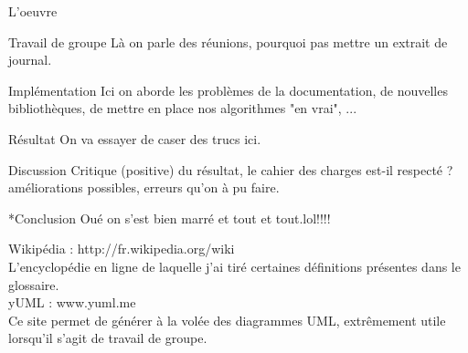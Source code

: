 \documentclass[a4paper, 12pt]{report}
\begin{document}
	\begin{part}{L'oeuvre}
		\begin{chapter}{Travail de groupe}
			Là on parle des réunions, pourquoi pas mettre un extrait de journal.
		\end{chapter}
		\begin{chapter}{Implémentation}
			Ici on aborde les problèmes de la documentation, de nouvelles bibliothèques, de mettre en place nos algorithmes "en vrai", ... 
		\end{chapter}
		\begin{chapter}{Résultat}
			On va essayer de caser des trucs ici.
		\end{chapter}
		\begin{chapter}{Discussion}
			Critique (positive) du résultat, le cahier des charges est-il respecté ? améliorations possibles, erreurs qu'on à pu faire.
		\end{chapter}
	\end{part}
	\begin{chapter}*{Conclusion}
		Oué on s'est bien marré et tout et tout.lol!!!!
	\end{chapter}
	\renewcommand\glossaryname{Glossaire}
	\printglossaries
	\listoffigures
	\renewcommand\bibname{Sitographie}%
	\begin{thebibliography}{2}
		Wikipédia : http://fr.wikipedia.org/wiki\\
		L'encyclopédie en ligne de laquelle j'ai tiré certaines définitions présentes dans le glossaire.
		~\\
		yUML : www.yuml.me \\
		Ce site permet de générer à la volée des diagrammes \gls{UML}, extrêmement utile lorsqu'il s'agit de travail de groupe.
	\end{thebibliography}
\end{document}
